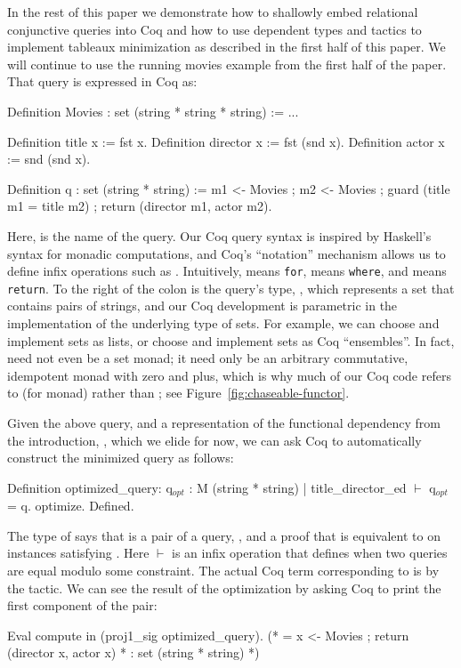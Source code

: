 \documentclass[preprint]{sigplanconf}
\begin{document}
In the rest of this paper we demonstrate how to shallowly embed relational conjunctive queries into Coq and how to use dependent types and tactics to implement tableaux minimization as described in the first half of this paper.  We will continue to use the running movies example from the first half of the paper.  That query is expressed in Coq as:
\begin{coq}
Definition Movies : set (string * string * string) := ...

Definition title x := fst x.
Definition director x := fst (snd x).
Definition actor x := snd (snd x).

Definition q : set (string * string) :=
  m1 <- Movies ; m2 <- Movies ;
  guard (title m1 = title m2) ;
  return (director m1, actor m2).
\end{coq}
Here,  is the name of the query.  Our Coq query syntax is inspired by Haskell's syntax for monadic computations, and Coq's ``notation'' mechanism allows us to define infix operations such as \coqe{<-}.  Intuitively, \coqe{<-} means {\tt for},  means {\tt where}, and  means {\tt return}.  To the right of the colon is the query's type, , which represents a set that contains pairs of strings, and our Coq development is parametric in the implementation of the underlying type of sets.  For example, we can choose  and implement sets as lists, or choose  and implement sets as Coq ``ensembles''.  In fact,  need not even be a set monad; it need only be an arbitrary commutative, idempotent monad with zero and plus, which is why much of our Coq code refers to  (for monad) rather than ; see Figure~\ref{fig:chaseable-functor}.

Given the above query, and a representation of the functional dependency from the introduction, , which we elide for now, we can ask Coq to automatically construct the minimized query as follows:
\begin{coq}
Definition optimized_query: 
{q$_{opt}$ : M (string * string) | title_director_ed $\vdash$ q$_{opt}$ = q}.
optimize.
Defined.
\end{coq}
The type of  says that  is a pair of a query, , and a proof that  is equivalent to  on instances satisfying .  Here $\vdash$ is an infix operation that defines when two queries are equal modulo some constraint.  The actual Coq term corresponding to  is  by the  tactic.  We can see the result of the optimization by asking Coq to print the first component of the pair:
\begin{coq}
Eval compute in (proj1_sig optimized_query).
(* = x <- Movies ; return (director x, actor x)
 *   : set (string * string)   *)
\end{coq}
\end{document}
